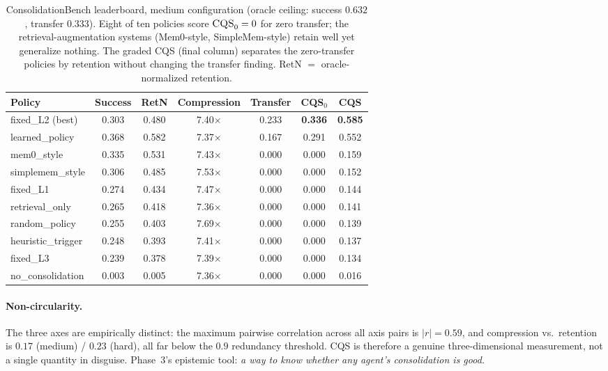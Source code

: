 \documentclass[11pt]{article}
\newcommand{\bench}{ConsolidationBench}
\newcommand{\cqs}{\textsc{CQS}}
\newcommand{\cqsz}{\textsc{CQS}\ensuremath{_0}}
\begin{document}
\begin{table}[h]\centering\small
\caption{\bench{} leaderboard, medium configuration (oracle ceiling: success $0.632$,
transfer $0.333$). Eight of ten policies score $\cqsz{}=0$ for zero transfer; the
retrieval-augmentation systems (Mem0-style, SimpleMem-style) retain well yet
generalize nothing. The graded \cqs{} (final column) separates the zero-transfer
policies by retention without changing the transfer finding. RetN $=$
oracle-normalized retention.}
\label{tab:leaderboard}
\begin{tabular}{lcccccc}
\toprule
Policy & Success & RetN & Compression & Transfer & \cqsz{} & \cqs{} \\
\midrule
fixed\_L2 (best) & 0.303 & 0.480 & 7.40$\times$ & 0.233 & \textbf{0.336} & \textbf{0.585} \\
learned\_policy & 0.368 & 0.582 & 7.37$\times$ & 0.167 & 0.291 & 0.552 \\
mem0\_style & 0.335 & 0.531 & 7.43$\times$ & 0.000 & 0.000 & 0.159 \\
simplemem\_style & 0.306 & 0.485 & 7.53$\times$ & 0.000 & 0.000 & 0.152 \\
fixed\_L1 & 0.274 & 0.434 & 7.47$\times$ & 0.000 & 0.000 & 0.144 \\
retrieval\_only & 0.265 & 0.418 & 7.36$\times$ & 0.000 & 0.000 & 0.141 \\
random\_policy & 0.255 & 0.403 & 7.69$\times$ & 0.000 & 0.000 & 0.139 \\
heuristic\_trigger & 0.248 & 0.393 & 7.41$\times$ & 0.000 & 0.000 & 0.137 \\
fixed\_L3 & 0.239 & 0.378 & 7.39$\times$ & 0.000 & 0.000 & 0.134 \\
no\_consolidation & 0.003 & 0.005 & 7.36$\times$ & 0.000 & 0.000 & 0.016 \\
\bottomrule
\end{tabular}
\end{table}

\paragraph{Non-circularity.} The three axes are empirically distinct: the maximum
pairwise correlation across all axis pairs is $|r| = 0.59$, and compression vs.\
retention is $0.17$ (medium) / $0.23$ (hard), all far below the $0.9$ redundancy
threshold. \cqs{} is therefore a genuine three-dimensional measurement, not a
single quantity in disguise. Phase~3's epistemic tool: \emph{a way to know whether any
agent's consolidation is good.}
\end{document}
